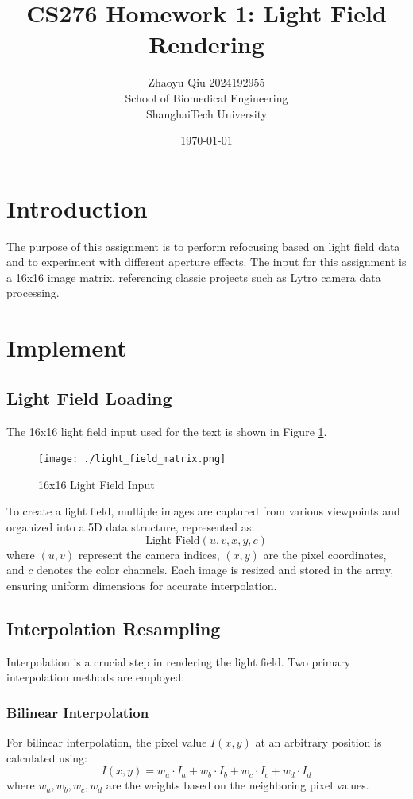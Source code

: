 \documentclass{article}
\begin{document}
\title{CS276 Homework 1: Light Field Rendering}
\author{Zhaoyu Qiu 2024192955\\ School of Biomedical Engineering \\ ShanghaiTech University }
\date{\today}
\maketitle

\section{Introduction}
The purpose of this assignment is to perform refocusing based on light field data and to experiment with different aperture effects. The input for this assignment is a 16x16 image matrix, referencing classic projects such as Lytro camera data processing.

\section{Implement}

\subsection{Light Field Loading}
The 16x16 light field input used for the text is shown in Figure \ref{fig:light_field}.

\begin{figure}[ht]
    \centering
    \texttt{[image: ./light\_field\_matrix.png]}  %
    \caption{16x16 Light Field Input}
    \label{fig:light_field}
\end{figure}

To create a light field, multiple images are captured from various viewpoints and organized into a 5D data structure, represented as:
\[
\text{Light Field}(u, v, x, y, c)
\]
where \( (u, v) \) represent the camera indices, \( (x, y) \) are the pixel coordinates, and \( c \) denotes the color channels. Each image is resized and stored in the array, ensuring uniform dimensions for accurate interpolation.

\subsection{Interpolation Resampling}
Interpolation is a crucial step in rendering the light field. Two primary interpolation methods are employed:

\subsubsection{Bilinear Interpolation}
For bilinear interpolation, the pixel value \( I(x, y) \) at an arbitrary position is calculated using:
\[
I(x, y) = w_a \cdot I_a + w_b \cdot I_b + w_c \cdot I_c + w_d \cdot I_d
\]
where \( w_a, w_b, w_c, w_d \) are the weights based on the neighboring pixel values.
\end{document}
